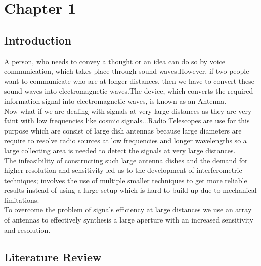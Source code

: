 
%
	
\chapter{Chapter 1}
\section{Introduction}
A person, who needs to convey a thought or an idea can do so by voice communication, which takes place through sound waves.However, if two people want to communicate who are at longer distances, then we have to convert these sound waves into electromagnetic waves.The device, which converts the required information signal into electromagnetic waves, is known as an Antenna.\\
Now what if we are dealing with signals at very large distances as they are very faint with low frequencies like cosmic signals...Radio Telescopes are use for this purpose which are consist of large dish antennas because large diameters are require to resolve radio sources at low frequencies and longer wavelengths so a large collecting area is needed to detect the signals at very large distances.\\
The infeasibility of constructing such large antenna dishes and the demand for higher resolution and sensitivity led us to the development of interferometric techniques; involves the use of multiple smaller techniques to get more reliable results instead of using a large setup which is hard to build up due to mechanical limitations.\\
To overcome the problem of signals efficiency at large distances we use an array of antennas to effectively synthesis a large aperture with an increased sensitivity and resolution.
 
\section{Literature Review}

